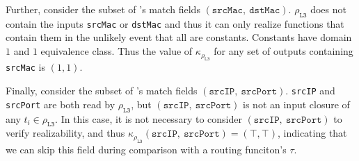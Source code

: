 Further, consider the subset of \exampledp's match fields $(\texttt{srcMac},\ \texttt{dstMac})$. $\rho_{\texttt{L3}}$ does not contain the inputs \texttt{srcMac} or \texttt{dstMac} and thus it can only realize functions that contain them in the unlikely event that all are constants.  Constants have domain $1$ and $1$ equivalence class. Thus the value of $\kappa_{\rho_{\texttt{L3}}}$ for any set of outputs containing \texttt{srcMac} is $(1, 1)$.

Finally, consider the subset of \exampledp's match fields $(\texttt{srcIP},\ \texttt{srcPort})$. \texttt{srcIP} and \texttt{srcPort} are both read by $\rho_{\texttt{L3}}$, but $(\texttt{srcIP},\ \texttt{srcPort})$ is not an input closure of any $t_i \in \rho_{\texttt{L3}}$. In this case, it is not necessary to consider $(\texttt{srcIP},\ \texttt{srcPort})$ to verify realizability, and thus $\kappa_{\rho_{\texttt{L3}}}(\texttt{srcIP},\ \texttt{srcPort}) = (\intercal, \intercal)$, indicating that we can skip this field during comparison with a routing funciton's $\tau$.












